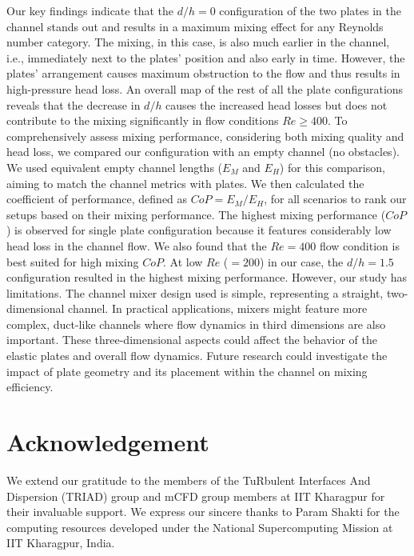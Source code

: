 \documentclass[reprint,a4paper,fleqn]{cas-dc} %
\begin{document}
		Our key findings indicate that the $d/h=0$ configuration of the two plates in the channel stands out and results in a maximum mixing effect for any Reynolds number category. The mixing, in this case, is also much earlier in the channel, i.e., immediately next to the plates' position and also early in time. However, the plates' arrangement causes maximum obstruction to the flow and thus results in high-pressure head loss. An overall map of the rest of all the plate configurations reveals that the decrease in $d/h$ causes the increased head losses but does not contribute to the mixing significantly in flow conditions $Re\geq400$. To comprehensively assess mixing performance, considering both mixing quality and head loss, we compared our configuration with an empty channel (no obstacles). We used equivalent empty channel lengths ($E_M$ and $E_H$) for this comparison, aiming to match the channel metrics with plates. We then calculated the coefficient of performance, defined as $CoP = E_M/E_H$, for all scenarios to rank our setups based on their mixing performance. The highest mixing performance ($CoP$) is observed for single plate configuration because it features considerably low head loss in the channel flow. We also found that the $Re=400$ flow condition is best suited for high mixing $CoP$. At low $Re$ ($=200$) in our case, the $d/h=1.5$ configuration resulted in the highest mixing performance.
		However, our study has limitations. The channel mixer design used is simple, representing a straight, two-dimensional channel. In practical applications, mixers might feature more complex, duct-like channels where flow dynamics in third dimensions are also important. These three-dimensional aspects could affect the behavior of the elastic plates and overall flow dynamics. Future research could investigate the impact of plate geometry and its placement within the channel on mixing efficiency.
		
		\section{Acknowledgement}
		We extend our gratitude to the members of the TuRbulent Interfaces And Dispersion (TRIAD) group and mCFD group members at IIT Kharagpur for their invaluable support. We express our sincere thanks to Param Shakti for the computing resources developed under the National Supercomputing Mission at IIT Kharagpur, India.
		
		
	
\end{document}
